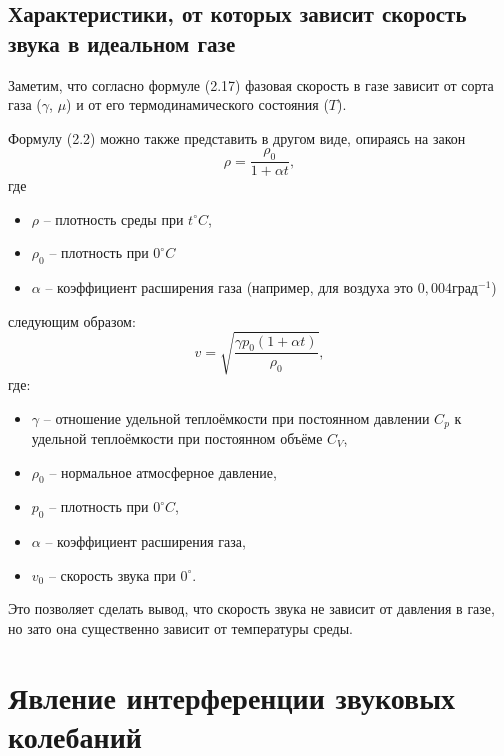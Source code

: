 \documentclass[referat,times]{SCWorks}
\begin{document}
\subsection{Характеристики, от которых зависит скорость звука в идеальном газе}
\par Заметим, что согласно формуле (2.17) фазовая скорость в газе зависит от сорта газа ($\gamma$, $\mu$) и от его термодинамического состояния ($T$).
\par Формулу (2.2) можно также представить в другом виде, опираясь на закон
\begin{equation}
    \rho = \frac{\rho_0}{1 + \alpha t},
\end{equation}
где
\begin{itemize}
    \item $\rho$ -- плотность среды при $t^\circ C$,
    \item $\rho_0$ -- плотность при $0^\circ C$
    \item $\alpha$ -- коэффициент расширения газа (например, для воздуха это $0,004 \text{град}^{-1}$)
\end{itemize}
следующим образом:
\begin{equation}
    v = \sqrt{\frac{\gamma p_0(1 + \alpha t)}{\rho_0}},
\end{equation}
где:
\begin{itemize}
    \item $\gamma$ -- отношение удельной теплоёмкости при постоянном давлении $C_p$ к удельной теплоёмкости при постоянном объёме $C_V$,
    \item $\rho_0$ -- нормальное атмосферное давление,
    \item $p_0$ -- плотность при $0^\circ C$,
    \item $\alpha$ -- коэффициент расширения газа,
    \item $v_0$ -- скорость звука при $0^\circ$.
\end{itemize}
\par Это позволяет сделать вывод, что скорость звука не зависит от давления в газе, но зато она существенно зависит от температуры среды.

\section{Явление интерференции звуковых колебаний}
\end{document}
